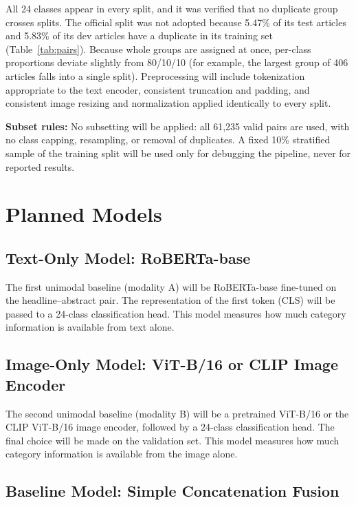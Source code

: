 \documentclass[11pt,a4paper]{article}
\begin{document}
All 24 classes appear in every split, and it was verified that no duplicate group crosses splits. The official split was not adopted because 5.47\% of its test articles and 5.83\% of its dev articles have a duplicate in its training set (Table~\ref{tab:pairs}). Because whole groups are assigned at once, per-class proportions deviate slightly from 80/10/10 (for example, the largest group of 406 articles falls into a single split). Preprocessing will include tokenization appropriate to the text encoder, consistent truncation and padding, and consistent image resizing and normalization applied identically to every split.

\textbf{Subset rules:} No subsetting will be applied: all 61,235 valid pairs are used, with no class capping, resampling, or removal of duplicates. A fixed 10\% stratified sample of the training split will be used only for debugging the pipeline, never for reported results.

\section{Planned Models}

\subsection{Text-Only Model: RoBERTa-base}

The first unimodal baseline (modality A) will be RoBERTa-base fine-tuned on the headline--abstract pair. The representation of the first token (CLS) will be passed to a 24-class classification head. This model measures how much category information is available from text alone.

\subsection{Image-Only Model: ViT-B/16 or CLIP Image Encoder}

The second unimodal baseline (modality B) will be a pretrained ViT-B/16 or the CLIP ViT-B/16 image encoder, followed by a 24-class classification head. The final choice will be made on the validation set. This model measures how much category information is available from the image alone.

\subsection{Baseline Model: Simple Concatenation Fusion}
\end{document}
